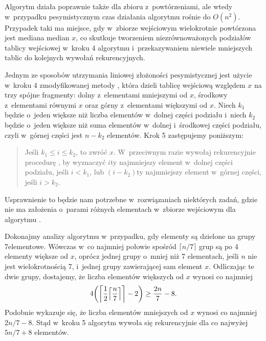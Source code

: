 
\noindent Algorytm  działa poprawnie także dla zbioru z~powtórzeniami, ale wtedy w~przypadku pesymistycznym czas działania algorytmu rośnie do $O(n^2)$.
Przypadek taki ma miejsce, gdy w~zbiorze wejściowym wielokrotnie powtórzona jest mediana median $x$, co skutkuje tworzeniem niezrównoważonych podziałów tablicy wejściowej w~kroku 4 algorytmu i~przekazywaniem niewiele mniejszych tablic do kolejnych wywołań rekurencyjnych.

Jednym ze sposobów utrzymania liniowej złożoności pesymistycznej jest użycie w~kroku 4 zmodyfikowanej metody , która dzieli tablicę wejściową względem $x$ na trzy spójne fragmenty: dolny z~elementami mniejszymi od $x$, środkowy z~elementami równymi $x$ oraz górny z~elementami większymi od $x$.
Niech $k_1$ będzie o~jeden większe niż liczba elementów w~dolnej części podziału i~niech $k_2$ będzie o~jeden większe niż suma elementów w~dolnej i~środkowej części podziału, czyli w~górnej części jest $n-k_2$ elementów.
Krok 5 zastępujemy poniższym:
\begin{quote}
	Jeśli $k_1\le i\le k_2$, to zwróć $x$.
	W~przeciwnym razie wywołaj rekurencyjnie procedurę , by wyznaczyć $i$\nbhyphen ty najmniejszy element w~dolnej części podziału, jeśli $i<k_1$, lub $(i-k_2)$\nbhyphen ty najmniejszy element w~górnej części, jeśli $i>k_2$.
\end{quote}

Usprawnienie to będzie nam potrzebne w~rozwiązaniach niektórych zadań, gdzie nie ma założenia o~parami różnych elementach w~zbiorze wejściowym dla algorytmu .

\exercise %
Dokonajmy analizy algorytmu  w~przypadku, gdy elementy są dzielone na grupy 7\nbhyphen elementowe.
Wówczas w~co najmniej połowie spośród $\lceil n/7\rceil$ grup są po 4 elementy większe od $x$, oprócz jednej grupy o~mniej niż 7 elementach, jeśli $n$ nie jest wielokrotnością 7, i~jednej grupy zawierającej sam element $x$.
Odliczając te dwie grupy, dostajemy, że liczba elementów większych od $x$ wynosi co najmniej
\[
	4\biggl(\biggl\lceil\frac{1}{2}\Bigl\lceil\frac{n}{7}\Bigr\rceil\biggr\rceil-2\biggr) \ge \frac{2n}{7}-8.
\]
Podobnie wykazuje się, że liczba elementów mniejszych od $x$ wynosi co najmniej $2n/7-8$.
Stąd w~kroku 5 algorytm wywoła się rekurencyjnie dla co najwyżej $5n/7+8$ elementów.

